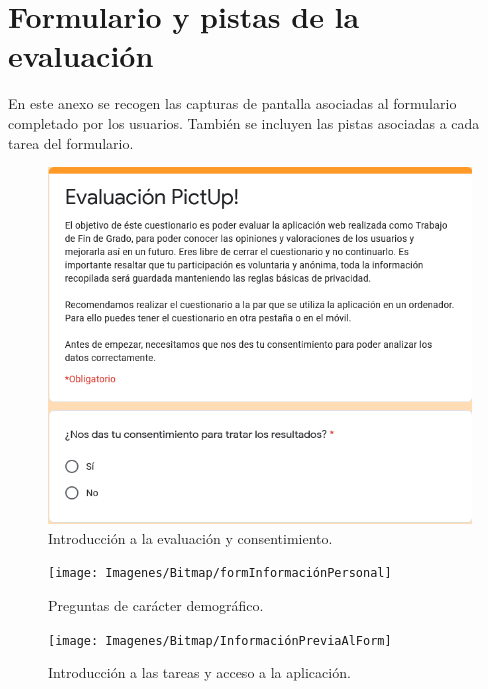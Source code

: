 \chapter{Formulario y pistas de la evaluación}
\label{Appendix:Key1}

En este anexo se recogen las capturas de pantalla asociadas al formulario completado por los usuarios. También se incluyen las pistas asociadas a cada tarea del formulario.

\begin{figure}[h!]
	\centering
	\includegraphics[width=0.7\linewidth]{Imagenes/Bitmap/formIntro}
	\caption{Introducción a la evaluación y consentimiento.}
	\label{fig:formintro}
\end{figure}

\begin{figure}[h!]
	\centering
	\texttt{[image: Imagenes/Bitmap/formInformaciónPersonal]}
	\caption{Preguntas de carácter demográfico.}
	\label{fig:forminformacionpersonal}
\end{figure}

\begin{figure}[h!]
	\centering
	\texttt{[image: Imagenes/Bitmap/InformaciónPreviaAlForm]}
	\caption{Introducción a las tareas y acceso a la aplicación.}
	\label{fig:informacionpreviaalform}
\end{figure}





